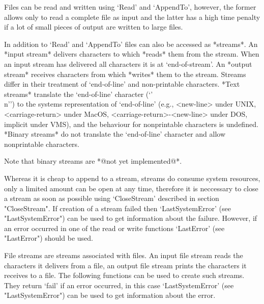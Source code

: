 


Files can be read and  written using `Read'  and `AppendTo', however, the
former allows only to read a complete file as {\GAP} input and the latter
has a high time penalty if a lot of small pieces of output are written to
large files.

In addition  to  `Read'  and `AppendTo'  files  can  also be  accessed as
*streams*.  An *input stream* delivers characters to {\GAP} which *reads*
them from the stream.  When an  input stream has delivered all characters
it is  at `end-of-stream'.  An  *output  stream* receives characters from
{\GAP} which *writes* them   to  the stream.    Streams differ in   their
treatment of `end-of-line' and  non-printable characters.  *Text streams*
translate the `end-of-line'     character (`{'\\n'}')  to  the    systems
representation   of   `end-of-line'   (e.g.,    <new-line>  under   UNIX,
<carriage-return> under  MacOS,  <carriage-return>-<new-line> under  DOS,
implicit under VMS), and  the behaviour  for nonprintable characters   is
undefined.  *Binary streams* do not translate the `end-of-line' character
and allow nonprintable characters.

Note that binary streams are *@not yet implemented@*.

Whereas it   is cheap to append  to  a stream, streams  do consume system
resources, only a limited amount can be open at any time, therefore it is
neccessary  to  close a stream   as soon as possible  using `CloseStream'
described in section "CloseStream".  If  creation of a stream failed then
`LastSystemError' (see "LastSystemError") can  be used to get information
about the failure.  However,  if an error occurred  in one of the read or
write functions `LastError' (see "LastError") should be used.


File streams  are  streams associated with  files.  An  input file stream
reads  the characters  it delivers from  a  file,  an output  file stream
prints the characters it receives to a file.  The following functions can
be used to create such streams.  They return `fail' if an error occurred,
in this case `LastSystemError' (see "LastSystemError") can be used to get
information about the error.


